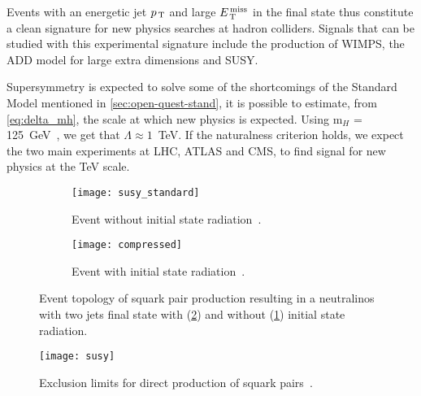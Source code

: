 Events with an energetic jet $p_\mathrm{\, T}$ and large $E_\mathrm{\, T}^\mathrm{\, miss}$ in the final state thus
constitute a clean signature for new physics searches at hadron
colliders. Signals that can be studied with this experimental signature include
the production of WIMPS, the ADD model for large extra dimensions and SUSY\@.

Supersymmetry is expected to solve some of the shortcomings of the Standard
Model mentioned in \cref{sec:open-quest-stand}, it is possible to estimate, from
\cref{eq:delta_mh}, the scale at which new physics is expected. Using m$_H$ =
125~GeV~\cite{PDG}, we get that $\Lambda \approx 1$~TeV. If the naturalness
criterion holds, we expect the two main experiments at LHC, ATLAS and CMS, to
find signal for new physics at the TeV scale.

\begin{figure}[!h]
  \centering
  \begin{subfigure}[t]{.48\linewidth}
    \texttt{[image: susy\_standard]}
    \caption{Event without initial state radiation~\cite{SUSYPub}.}
    \label{fig:susy_standard}
  \end{subfigure} \quad
  \begin{subfigure}[t]{.48\linewidth}
    \texttt{[image: compressed]}
    \caption{Event with initial state radiation~\cite{ExotPub}.}
    \label{fig:susy_compressed}
  \end{subfigure}
  \caption{Event topology of squark pair production resulting in a neutralinos
    with two jets final state with (\cref{fig:susy_compressed}) and without
    (\cref{fig:susy_standard}) initial state radiation.}
  \label{fig:motivation}
\end{figure}

\begin{figure}[!h]
  \centering
  \texttt{[image: susy]}
  \caption{Exclusion limits for direct production of squark
    pairs~\cite{SUSYPub}.}
  \label{fig:susy_exclusion}
\end{figure}
